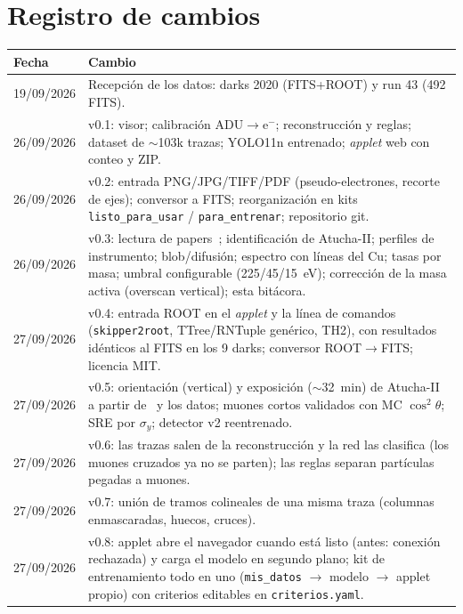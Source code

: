 \documentclass[10pt,a4paper]{article}
\newcommand{\eminus}{e$^-$}
\begin{document}
\section{Registro de cambios}
{\small\noindent
\begin{tabularx}{\textwidth}{@{}lX@{}}
\toprule
Fecha & Cambio \\
\midrule
19/09/2026 & Recepción de los datos: darks 2020 (FITS+ROOT) y run 43 (492 FITS). \\
26/09/2026 & v0.1: visor; calibración ADU$\to$\eminus; reconstrucción y reglas; dataset de $\sim$103k trazas;
  YOLO11n entrenado; \emph{applet} web con conteo y ZIP. \\
26/09/2026 & v0.2: entrada PNG/JPG/TIFF/PDF (pseudo-electrones, recorte de ejes); conversor a FITS;
  reorganización en kits \texttt{listo\_para\_usar} / \texttt{para\_entrenar}; repositorio git. \\
26/09/2026 & v0.3: lectura de papers~\cite{depaoli2024,connie2025,mirthis2025,mirthis2026}; identificación de
  Atucha-II; perfiles de instrumento; blob/difusión; espectro con líneas del Cu; tasas por masa; umbral
  configurable (225/45/15~eV); corrección de la masa activa (overscan vertical); esta bitácora. \\
27/09/2026 & v0.4: entrada ROOT en el \emph{applet} y la línea de comandos (\texttt{skipper2root}, TTree/RNTuple
  genérico, TH2), con resultados idénticos al FITS en los 9 darks; conversor ROOT$\to$FITS; licencia MIT. \\
27/09/2026 & v0.5: orientación (vertical) y exposición ($\sim$32~min) de Atucha-II a partir de~\cite{depaoli2024} y
  los datos; muones cortos validados con MC $\cos^2\theta$; SRE por $\sigma_y$; detector v2 reentrenado. \\
27/09/2026 & v0.6: las trazas salen de la reconstrucción y la red las clasifica (los muones cruzados ya no se
  parten); las reglas separan partículas pegadas a muones. \\
27/09/2026 & v0.7: unión de tramos colineales de una misma traza (columnas enmascaradas, huecos, cruces). \\
27/09/2026 & v0.8: applet abre el navegador cuando está listo (antes: conexión rechazada) y carga el modelo en
  segundo plano; kit de entrenamiento todo en uno (\texttt{mis\_datos} $\to$ modelo $\to$ applet propio) con
  criterios editables en \texttt{criterios.yaml}. \\
\bottomrule
\end{tabularx}}
\end{document}
